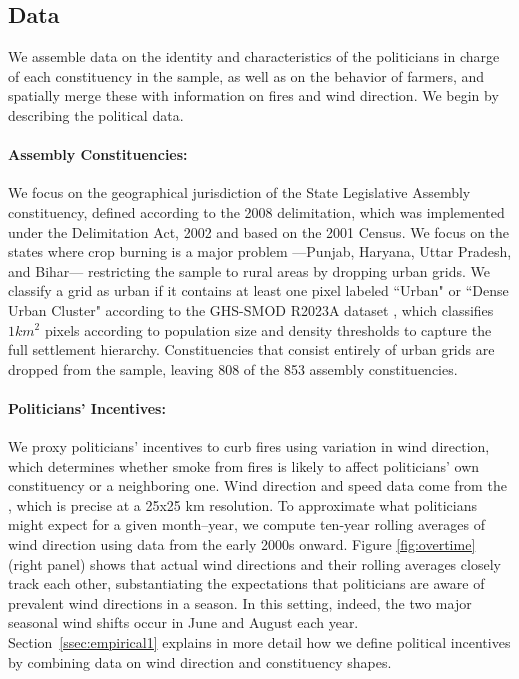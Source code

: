 \documentclass[12pt]{article}
\begin{document}
\subsection{Data\label{ssec:data1}}

We assemble data on the identity and characteristics of the politicians in charge of each constituency in the sample, as well as on the behavior of farmers, and spatially merge these with information on fires and wind direction. We begin by describing the political data.

\paragraph{Assembly Constituencies:} We focus on the geographical jurisdiction of the State Legislative Assembly constituency, defined according to the 2008 delimitation, which was implemented under the Delimitation Act, 2002 \citep{delimitation_act_2002} and
based on the 2001 Census. We focus on the states where crop burning is a major problem ---Punjab, Haryana, Uttar Pradesh, and Bihar--- restricting the sample to rural areas by dropping urban grids. We classify a grid as urban if it contains at least one pixel labeled ``Urban" or ``Dense Urban Cluster" according to the GHS-SMOD R2023A dataset \citep{ghs2023smodR2023}, which classifies
$1km^2$ pixels according to population size and density thresholds to capture the full settlement
hierarchy. Constituencies that consist entirely of urban grids are dropped from the sample, leaving 808 of the 853 assembly constituencies. 



\paragraph{Politicians' Incentives:} We proxy politicians' incentives to curb fires using variation in wind direction, which determines whether smoke from fires is likely to affect politicians' own constituency or a neighboring one. Wind direction and speed data come from the \citet{munozsabater2019era5landmonthly}, which is precise at a 25x25 km resolution. To approximate what politicians might expect for a given month–year, we compute ten-year rolling averages of wind direction using data from the early 2000s onward. Figure \ref{fig:overtime} (right panel) shows that actual wind directions and their rolling averages closely track each other, substantiating the expectations that politicians are aware of prevalent wind directions in a season. In this setting, indeed, the two major seasonal wind shifts occur in June and August each year. Section~\ref{ssec:empirical1} explains in more detail how we define political incentives by combining data on wind direction and constituency shapes.
\end{document}
